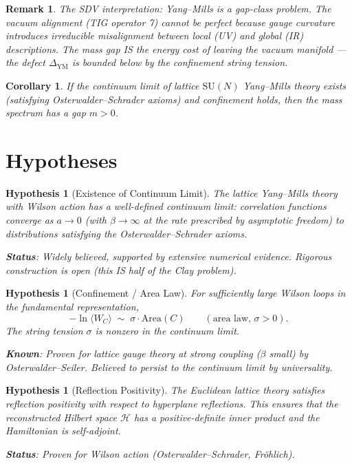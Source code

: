 \documentclass[11pt]{article}
\newtheorem{hypothesis}[lemma]{Hypothesis}
\newtheorem{corollary}[lemma]{Corollary}
\newtheorem{remark}[lemma]{Remark}
\theoremstyle{definition}
\begin{document}
\begin{remark}
The SDV interpretation: Yang--Mills is a \emph{gap-class} problem.  The vacuum alignment
(TIG operator 7) cannot be perfect because gauge curvature introduces irreducible
misalignment between local (UV) and global (IR) descriptions.  The mass gap IS the
energy cost of leaving the vacuum manifold --- the defect $\Delta_{\mathrm{YM}}$ is
bounded below by the confinement string tension.
\end{remark}

\begin{corollary}
\label{cor:massgap}
If the continuum limit of lattice $\mathrm{SU}(N)$ Yang--Mills theory exists
(satisfying Osterwalder--Schrader axioms) and confinement holds, then
the mass spectrum has a gap $m > 0$.
\end{corollary}

\section{Hypotheses}

\begin{hypothesis}[Existence of Continuum Limit]
\label{hyp:continuum}
The lattice Yang--Mills theory with Wilson action has a well-defined
continuum limit: correlation functions converge as $a \to 0$ (with
$\beta \to \infty$ at the rate prescribed by asymptotic freedom)
to distributions satisfying the Osterwalder--Schrader axioms.

\textbf{Status}: Widely believed, supported by extensive numerical evidence.
Rigorous construction is open (this IS half of the Clay problem).
\end{hypothesis}

\begin{hypothesis}[Confinement / Area Law]
\label{hyp:confinement}
For sufficiently large Wilson loops in the fundamental representation,
\[
  -\ln \langle W_C \rangle \;\sim\; \sigma \cdot \mathrm{Area}(C)
  \qquad (\text{area law, } \sigma > 0).
\]
The string tension $\sigma$ is nonzero in the continuum limit.

\textbf{Known}: Proven for lattice gauge theory at strong coupling ($\beta$ small)
by Osterwalder--Seiler.  Believed to persist to the continuum limit by universality.
\end{hypothesis}

\begin{hypothesis}[Reflection Positivity]
\label{hyp:RP}
The Euclidean lattice theory satisfies reflection positivity with respect to
hyperplane reflections.  This ensures that the reconstructed Hilbert space
$\mathcal{H}$ has a positive-definite inner product and the Hamiltonian is self-adjoint.

\textbf{Status}: Proven for Wilson action (Osterwalder--Schrader, Fr\"ohlich).
\end{hypothesis}
\end{document}
